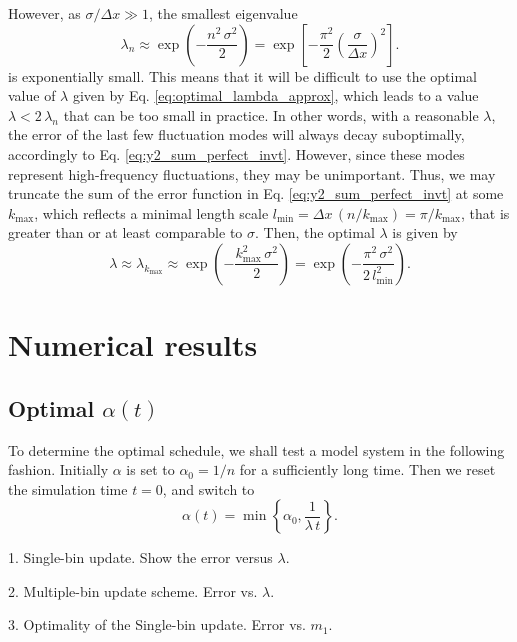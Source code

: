 \documentclass[reprint]{revtex4-1}
\begin{document}
However,
as $\sigma/\Delta x \gg 1$,
the smallest eigenvalue
%
$$
\lambda_n
\approx
\exp\left(
      -\frac{ n^2 \, \sigma^2 }
            {        2        }
    \right)
=
\exp\left[
      -\frac{ \pi^2 }{ 2 }
      \left(
        \frac{  \sigma }
             { \Delta x }
      \right)^2
    \right]
.
$$
%
is exponentially small.
%
This means that it will be difficult
to use the optimal value of $\lambda$
given by Eq. \eqref{eq:optimal_lambda_approx},
which leads to a value
$\lambda < 2 \, \lambda_n$
that can be too small in practice.
%
In other words,
with a reasonable $\lambda$,
the error of the last few fluctuation modes
will always decay suboptimally,
accordingly to Eq. \eqref{eq:y2_sum_perfect_invt}.
%
However, since these modes
represent high-frequency fluctuations,
they may be unimportant.
%
Thus,
we may truncate the sum of the error function
in Eq. \eqref{eq:y2_sum_perfect_invt}
at some $k_{\max}$,
which reflects a minimal length scale
$l_{\min} = \Delta x \, (n /k_{\max}) = \pi/k_{\max}$,
that is greater than or
at least comparable to $\sigma$.
%
Then, the optimal $\lambda$ is given by
$$
\lambda
\approx
\lambda_{ k_{\max} }
\approx
\exp\left(
      -\frac{ k_{\max}^2 \, \sigma^2 }
            {           2            }
    \right)
=
\exp\left(
      -\frac{  \pi^2 \, \sigma^2    }
            {    2 \, l_{\min}^2  }
    \right).
$$




\section{Numerical results}


\subsection{Optimal $\alpha(t)$}


To determine the optimal schedule,
we shall test a model system
in the following fashion.
%
Initially $\alpha$ is set to $\alpha_0 = 1/n$
for a sufficiently long time.
%
Then we reset the simulation time $t = 0$,
and switch to
$$
\alpha(t) = \min\left\{ \alpha_0, \frac{ 1 } { \lambda \, t } \right\}.
$$


1. Single-bin update.
Show the error versus $\lambda$.


2. Multiple-bin update scheme.
Error vs. $\lambda$.

3. Optimality of the Single-bin update.
Error vs. $m_1$.
\end{document}
